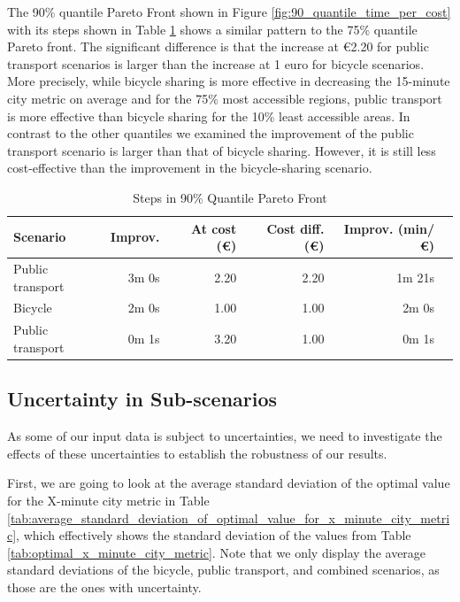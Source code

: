 The 90\% quantile Pareto Front shown in Figure \ref{fig:90_quantile_time_per_cost} with its steps shown in Table \ref{tab:differences_in_90_quantile_pareto_front} shows a similar pattern to the 75\% quantile Pareto front.
The significant difference is that the increase at \euro{2.20} for public transport scenarios is larger than the increase at 1 euro for bicycle scenarios.
More precisely, while bicycle sharing is more effective in decreasing the 15-minute city metric on average and for the 75\% most accessible regions, public transport is more effective than bicycle sharing for the 10\% least accessible areas.
In contrast to the other quantiles we examined the improvement of the public transport scenario is larger than that of bicycle sharing. 
However, it is still less cost-effective than the improvement in the bicycle-sharing scenario.


\begin{table}
  \caption{Steps in 90\% Quantile Pareto Front}
  \label{tab:differences_in_90_quantile_pareto_front}
  \begin{center}
    \begin{tabular}{|l|r|r|r|r|l|}
    \hline
     Scenario & Improv. & At cost (\euro) & Cost diff. (\euro) & Improv. (min/\euro) \\
     \hline
     Public transport & 3m 0s & 2.20 & 2.20 & 1m 21s \\
     \hline
     Bicycle & 2m 0s & 1.00 & 1.00 & 2m 0s \\
     \hline
     Public transport & 0m 1s & 3.20 & 1.00 & 0m 1s \\
     \hline
    \end{tabular}
  \end{center}
\end{table}


\subsection{Uncertainty in Sub-scenarios}
\label{subsec:uncertainty_subscenarios}

As some of our input data is subject to uncertainties, we need to investigate the effects of these uncertainties to establish the robustness of our results.

First, we are going to look at the average standard deviation of the optimal value for the X-minute city metric in Table \ref{tab:average_standard_deviation_of_optimal_value_for_x_minute_city_metric}, which effectively shows the standard deviation of the values from Table \ref{tab:optimal_x_minute_city_metric}.
Note that we only display the average standard deviations of the bicycle, public transport, and combined scenarios, as those are the ones with uncertainty.

